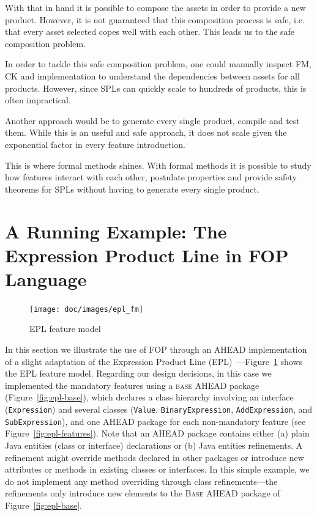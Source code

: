 With that in hand it is possible to compose the assets in order to provide a new product. However, it is not guaranteed that this composition process is safe, i.e.
that every asset selected copes well with each other. This leads us to the safe composition problem.

In order to tackle this safe composition problem, one could manually inspect
\gls{FM}, \gls{CK} and implementation to understand the dependencies between assets for all products. However, since \glspl{SPL} can quickly scale to hundreds of products,
this is often impractical.

Another approach would be to generate every single product, compile and test them.
While this is an useful and safe approach, it does not scale given the exponential 
factor in every feature introduction.

This is where formal methods shines. With formal methods it is possible to study how features interact with each other, postulate properties
and provide safety theorems for \glspl{SPL} without having to generate every single product.

\section{A Running Example: The Expression Product Line in FOP Language}\label{seq:fop-ex}

\begin{figure}
    \centering
    \texttt{[image: doc/images/epl\_fm]}
    \label{fig:epl_fm}
    \caption{EPL feature model} 
\end{figure} 


In this section we illustrate the use of FOP through an AHEAD implementation 
of a slight adaptation of the Expression Product Line (EPL)~\cite{torgersen2004expression}---Figure~\ref{fig:epl_fm} shows 
the EPL feature model. Regarding our design decisions, 
in this case we implemented the mandatory features using a \textsc{base} AHEAD package (Figure~\ref{fig:epl-base}), which
declares a class hierarchy involving an interface (\texttt{Expression}) and
several classes (\texttt{Value}, \texttt{BinaryExpression}, \texttt{AddExpression}, and 
\texttt{SubExpression}), and one AHEAD package for each non-mandatory feature (see Figure~\ref{fig:epl-features}). Note 
that an AHEAD package contains either (a) plain Java entities (class or interface) declarations or (b) 
Java entities refinements. A refinement 
might override methods declared in other packages or 
introduce new attributes or methods in existing classes 
or interfaces. In this simple example, we do not implement any 
method overriding through class refinements---the refinements 
only introduce new elements to the \textsc{Base} AHEAD package 
of Figure~\ref{fig:epl-base}.  

